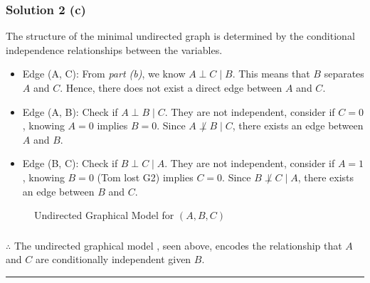 \documentclass{article}
\begin{document}
\subsubsection*{Solution 2 (c)}
The structure of the minimal undirected graph is determined by the conditional independence relationships between the variables.

\begin{itemize}
    \item Edge (A, C): From \textit{part (b)}, we know $A \perp C \mid B$. This means that $B$ separates $A$ and $C$. Hence, there does not exist a direct edge between $A$ and $C$.
    
    \item Edge (A, B): Check if $A \perp B \mid C$. They are not independent, consider if $C=0$, knowing $A=0$ implies $B=0$. Since $A \not\perp B \mid C$, there exists an edge between $A$ and $B$.
    
    \item Edge (B, C): Check if $B \perp C \mid A$. They are not independent, consider if $A=1$, knowing $B=0$ (Tom lost G2) implies $C=0$. Since $B \not\perp C \mid A$, there exists an edge between $B$ and $C$.
\end{itemize}

\begin{figure}[h!]
\centering
{}
\caption{Undirected Graphical Model for $(A, B, C)$}
\label{fig:ugm_abc}
\end{figure}

\subsubsection*{\normalfont}{$\therefore$ The undirected graphical model , seen above, encodes the relationship that $A$ and $C$ are conditionally independent given $B$.}

\noindent\rule{\textwidth}{0.4pt}\\

\newpage

\end{document}
